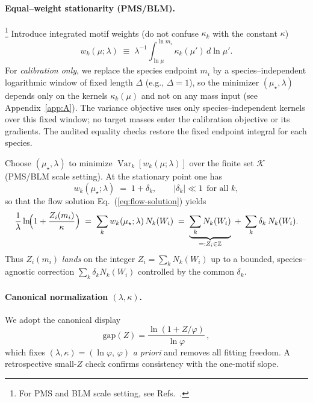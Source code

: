 \documentclass[aps,prd,onecolumn,amsmath,amssymb,superscriptaddress,nofootinbib,showpacs,showkeys]{revtex4-2}
\begin{document}
\paragraph{Equal--weight stationarity (PMS/BLM).}\footnote{For PMS and BLM scale setting, see Refs.~\cite{Stevenson81,BLM83}.}
Introduce integrated motif weights (do not confuse $\kappa_k$ with the constant $\kappa$)
\begin{equation}
  w_k(\mu;\lambda)\;\equiv\;\lambda^{-1}\!\int_{\ln\mu}^{\ln m_i}\!\kappa_k(\mu')\,d\ln\mu'.
  \label{eq:wk}
\end{equation}
For \emph{calibration only}, we replace the species endpoint $m_i$ by a species–independent logarithmic window of fixed length $\Delta$ (e.g., $\Delta=1$), so the minimizer $(\mu_\star,\lambda)$ depends only on the kernels $\kappa_k(\mu)$ and not on any mass input (see Appendix~\ref{app:A}). The variance objective uses only species–independent kernels over this fixed window; no target masses enter the calibration objective or its gradients. The audited equality checks restore the fixed endpoint integral for each species.

Choose $(\mu_\star,\lambda)$ to minimize $\operatorname{Var}_k[w_k(\mu;\lambda)]$ over the finite set $\mathcal K$ (PMS/BLM scale setting). At the stationary point one has
\begin{equation}
  w_k(\mu_\star;\lambda)\;=\;1+\delta_k,\qquad |\delta_k|\ll 1\ \ \text{for all }k,
  \label{eq:wk-equal}
\end{equation}
so that the flow solution Eq.~(\ref{eq:flow-solution}) yields
\begin{equation}
  \frac{1}{\lambda}\ln\!\Bigl(1+\frac{Z_i(m_i)}{\kappa}\Bigr)
  \;=\;\sum_k w_k(\mu_\star;\lambda)\,N_k(W_i)
  \;=\;\underbrace{\sum_k N_k(W_i)}_{=:Z_i\in\mathbb Z}\;+\;\sum_k \delta_k\,N_k(W_i).
  \label{eq:integer-landing}
\end{equation}
Thus $Z_i(m_i)$ \emph{lands} on the integer
$Z_i=\sum_k N_k(W_i)$ up to a bounded, species--agnostic correction $\sum_k\delta_k N_k(W_i)$ controlled by the common $\delta_k$.

\paragraph{Canonical normalization \texorpdfstring{$(\lambda,\kappa)$}{(lambda,kappa)}.}
We adopt the canonical display
\[
\mathrm{gap}(Z)=\frac{\ln(1+Z/\varphi)}{\ln\varphi}\,,
\]
which fixes $(\lambda,\kappa)=(\ln\varphi,\,\varphi)$ \emph{a priori} and removes all fitting freedom. A retrospective small-$Z$ check confirms consistency with the one-motif slope.
\end{document}
